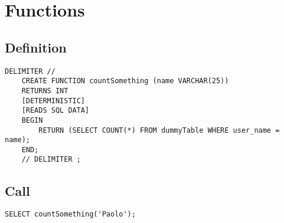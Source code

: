 \documentclass{article}
\begin{document}
\section{Functions}

\subsection{Definition}

\begin{lstlisting}[style=sql]
    DELIMITER //
    CREATE FUNCTION countSomething (name VARCHAR(25))
    RETURNS INT
    [DETERMINISTIC]
    [READS SQL DATA]
    BEGIN
        RETURN (SELECT COUNT(*) FROM dummyTable WHERE user_name = name);
    END;
    // DELIMITER ;
\end{lstlisting}

\subsection{Call}

\begin{lstlisting}[style=sql]
    SELECT countSomething('Paolo');
\end{lstlisting}

\pagebreak
\end{document}

